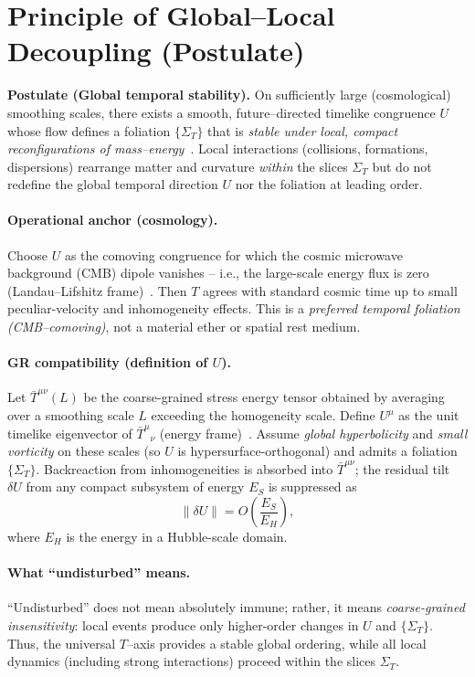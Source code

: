 \documentclass[12pt]{article}
\theoremstyle{plain} %
\begin{document}
\section*{Principle of Global–Local Decoupling (Postulate)}

\textbf{Postulate (Global temporal stability).} On sufficiently large (cosmological) smoothing scales, there exists a smooth, future–directed timelike congruence \(U\) whose flow defines a foliation \(\{\Sigma_T\}\) that is \emph{stable under local, compact reconfigurations of mass–energy}~\cite{Carroll2004}. Local interactions (collisions, formations, dispersions) rearrange matter and curvature \emph{within} the slices \(\Sigma_T\) but do not redefine the global temporal direction \(U\) nor the foliation at leading order.

\paragraph{Operational anchor (cosmology).}
Choose \(U\) as the comoving congruence for which the cosmic microwave background (CMB) dipole vanishes – i.e., the large-scale energy flux is zero (Landau–Lifshitz frame)~\cite{Rindler2006}. Then \(T\) agrees with standard cosmic time up to small peculiar-velocity and inhomogeneity effects. This is a \emph{preferred temporal foliation (CMB–comoving)}, not a material ether or spatial rest medium.

\paragraph{GR compatibility (definition of \(U\)).}
Let \(\bar T^{\mu\nu}(L)\) be the coarse-grained stress energy tensor obtained by averaging over a smoothing scale \(L\) exceeding the homogeneity scale. Define \(U^\mu\) as the unit timelike eigenvector of \(\bar T^{\mu}{}_{\nu}\) (energy frame)~\cite{Carroll2004}. Assume \emph{global hyperbolicity} and \emph{small vorticity} on these scales (so \(U\) is hypersurface-orthogonal) and admits a foliation \(\{\Sigma_T\}\). Backreaction from inhomogeneities is absorbed into \(\bar T^{\mu\nu}\); the residual tilt \(\delta U\) from any compact subsystem of energy \(E_S\) is suppressed as
\begin{equation}
\|\delta U\| = O\!\left(\frac{E_S}{E_H}\right),
\label{eq:deltaU}
\end{equation}
where \(E_H\) is the energy in a Hubble-scale domain.

\paragraph{What “undisturbed” means.}
“Undisturbed” does not mean absolutely immune; rather, it means \emph{coarse-grained insensitivity}: local events produce only higher-order changes in \(U\) and \(\{\Sigma_T\}\). Thus, the universal \(T\)–axis provides a stable global ordering, while all local dynamics (including strong interactions) proceed within the slices \(\Sigma_T\).
\end{document}
